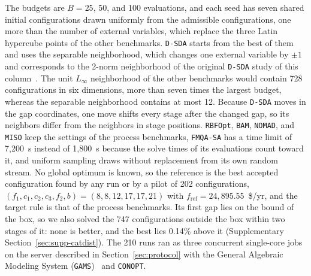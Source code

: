 \documentclass{article}
\begin{document}
The budgets are \(B=25\), 50, and 100 evaluations, and each seed has seven shared initial configurations drawn uniformly from the admissible configurations, one more than the number of external variables, which replace the three Latin hypercube points of the other benchmarks.
\texttt{D-SDA} starts from the best of them and uses the separable neighborhood, which changes one external variable by \(\pm1\) and corresponds to the 2-norm neighborhood of the original \texttt{D-SDA} study of this column~\citep{linan2020optimalII}.
The unit \(L_\infty\) neighborhood of the other benchmarks would contain 728 configurations in six dimensions, more than seven times the largest budget, whereas the separable neighborhood contains at most 12.
Because \texttt{D-SDA} moves in the gap coordinates, one move shifts every stage after the changed gap, so its neighbors differ from the neighbors in stage positions.
\texttt{RBFOpt}, \texttt{BAM}, \texttt{NOMAD}, and \texttt{MISO} keep the settings of the process benchmarks, \texttt{FMQA-SA} has a time limit of 7,200~s instead of 1,800~s because the solve times of its evaluations count toward it, and uniform sampling draws without replacement from its own random stream.
No global optimum is known, so the reference is the best accepted configuration found by any run or by a pilot of 202 configurations, \((f_1,c_1,c_2,c_3,f_2,b)=(8,8,12,17,17,21)\) with \(f_{\mathrm{ref}}=24{,}895.55\)~\$/yr, and the target rule is that of the process benchmarks.
Its first gap lies on the bound of the box, so we also solved the 747 configurations outside the box within two stages of it: none is better, and the best lies 0.14\% above it (Supplementary Section~\ref{sec:supp-catdist}).
The 210 runs ran as three concurrent single-core jobs on the server described in Section~\ref{sec:protocol} with the General Algebraic Modeling System (\texttt{GAMS})~\citep{gams2025} and \texttt{CONOPT}.
\end{document}
